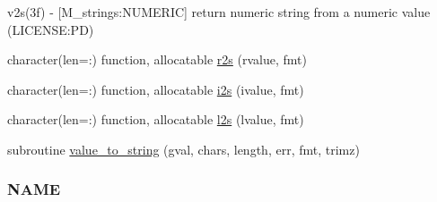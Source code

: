 \begin{DoxyCompactItemize}
\begin{DoxyCompactList}
v2s(3f) -\/ \mbox{[}M\+\_\+strings\+:N\+U\+M\+E\+R\+IC\mbox{]} return numeric string from a numeric value (L\+I\+C\+E\+N\+SE\+:PD) \end{DoxyCompactList}\item 
character(len=\+:) function, allocatable \mbox{\hyperlink{namespacem__time_a6fdd4bf34977b7a390ce93c75c2cc6d8}{r2s}} (rvalue, fmt)
\item 
character(len=\+:) function, allocatable \mbox{\hyperlink{namespacem__time_a7ae85160c5039dad604fd05efad2445f}{i2s}} (ivalue, fmt)
\item 
character(len=\+:) function, allocatable \mbox{\hyperlink{namespacem__time_a03e90459e69ffa353d1a6ce5765836fd}{l2s}} (lvalue, fmt)
\item 
subroutine \mbox{\hyperlink{namespacem__time_a0dac2380784afe63e06862095d589c22}{value\+\_\+to\+\_\+string}} (gval, chars, length, err, fmt, trimz)
\begin{DoxyCompactList}\small\item\em \subsubsection*{N\+A\+ME}


\end{DoxyCompactList}
\end{DoxyCompactItemize}
